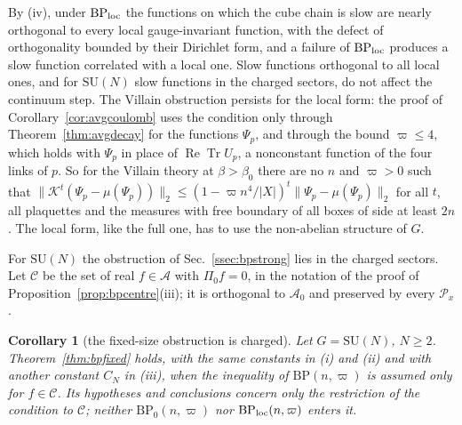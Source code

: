 \documentclass[aps,prd,twocolumn,superscriptaddress,nofootinbib,longbibliography,floatfix,amsmath,amssymb,10pt]{revtex4-2}
\newtheorem{corollary}[theorem]{Corollary}
\theoremstyle{definition}
\theoremstyle{remark}
\newcommand{\SU}{\mathrm{SU}}
\newcommand{\ReTr}{\operatorname{Re}\operatorname{Tr}}
\begin{document}
By (iv), under $\mathrm{BP}_{\rm loc}$ the functions on which the cube
chain is slow are nearly orthogonal to every local gauge-invariant function,
with the defect of orthogonality bounded by their Dirichlet form, and a
failure of $\mathrm{BP}_{\rm loc}$ produces a slow function correlated with a
local one. Slow functions orthogonal to all local ones, and for
$\SU(N)$ slow functions in the charged sectors, do not affect the continuum
step. The Villain obstruction persists for the local form: the proof of
Corollary~\ref{cor:avgcoulomb} uses the condition only through
Theorem~\ref{thm:avgdecay} for the functions $\Psi_p$, and through the bound
$\varpi\le4$, which holds with $\Psi_p$ in place of $\ReTr U_p$, a
nonconstant function of the four links of $p$. So for the Villain theory at
$\beta>\beta_0$ there are no $n$ and $\varpi>0$ such that
$\lVert\mathcal K^t(\Psi_p-\mu(\Psi_p))\rVert_2\le(1-\varpi n^4/\lvert X
\rvert)^t\lVert\Psi_p-\mu(\Psi_p)\rVert_2$ for all $t$, all plaquettes and
the measures with free boundary of all boxes of side at least $2n$. The
local form, like the full one, has to use the non-abelian structure of $G$.

For $\SU(N)$ the obstruction of Sec.~\ref{ssec:bpstrong} lies in the charged
sectors. Let $\mathcal C$ be the set of real $f\in\mathcal A$ with
$\Pi_0f=0$, in the notation of the proof of
Proposition~\ref{prop:bpcentre}(iii); it is orthogonal to $\mathcal A_0$ and
preserved by every $\mathcal P_x$.

\begin{corollary}[the fixed-size obstruction is charged]\label{cor:bpcharged}
Let $G=\SU(N)$, $N\ge2$. Theorem~\ref{thm:bpfixed} holds, with the same
constants in \textup{(i)} and \textup{(ii)} and with another constant $C_N$
in \textup{(iii)}, when the inequality of $\mathrm{BP}(n,\varpi)$ is assumed
only for $f\in\mathcal C$. Its hypotheses and conclusions concern only the
restriction of the condition to $\mathcal C$; neither $\mathrm{BP}_0(n,
\varpi)$ nor $\mathrm{BP}_{\rm loc}(n,\varpi)$ enters it.
\end{corollary}
\end{document}

